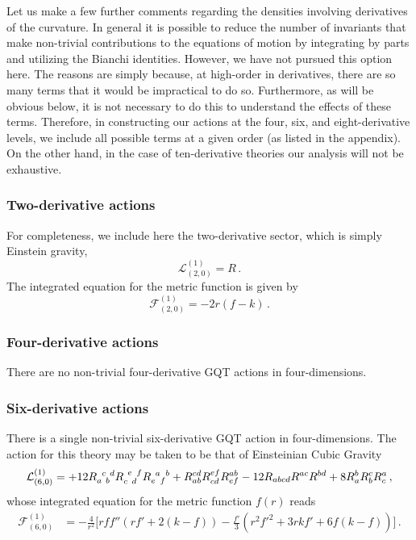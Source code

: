 \documentclass[11pt]{article}
\newcommand{\be}{\begin{equation}}
\newcommand{\ee}{\end{equation} }
\begin{document}
{Let us make a few further comments regarding the densities involving derivatives of the curvature. In general it is possible to reduce the number of invariants that make non-trivial contributions to the equations of motion by integrating by parts and utilizing the Bianchi identities. However, we have not pursued this option here. The reasons are simply because, at high-order in derivatives, there are so many terms that it would be impractical to do so. Furthermore, as will be obvious below, it is not necessary to do this  to understand the effects of these terms. Therefore, in constructing our actions at the four, six, and eight-derivative levels, we include all possible terms at a given order (as listed in the appendix). On the other hand, in the case of ten-derivative theories our analysis will not be exhaustive. %


\subsubsection{Two-derivative actions}

For completeness, we include here the two-derivative sector, which is simply Einstein gravity, 
\begin{equation}
\mathcal{L}_{(2,0)}^{(1)}= R \, .
\end{equation}
The integrated equation for the metric function is given by
\be \label{EEEin}
\mathcal{F}^{(1)}_{(2,0)} = -2 r (f-k) \, .
\ee


\subsubsection{Four-derivative actions}

There are no non-trivial four-derivative GQT actions in four-dimensions.

\subsubsection{Six-derivative actions}

There is a single non-trivial six-derivative GQT action in four-dimensions. The action for this theory may be taken to be that of Einsteinian Cubic Gravity  \cite{PabloPablo}
\begin{equation}
\mathcal{L}_{(6,0)}^{(1)}=+12 \tensor{R}{_{a}^{c}_{b}^{d}}\tensor{R}{_{c}^{e}_{d}^{f}}\tensor{R}{_{e}^{a}_{f}^{b}}+R_{ab}^{cd}R_{cd}^{ef}R_{ef}^{ab}-12R_{abcd}R^{ac}R^{bd}+8R_{a}^{b}R_{b}^{c}R_{c}^{a}\, ,
\end{equation}
whose integrated equation for the metric function $f(r)$ reads \cite{Hennigar:2016gkm,PabloPablo2}
\begin{align}
\mathcal{F}_{(6,0)}^{(1)} &= - \frac{4}{r^2} \bigg[ r f f'' \left(rf' + 2(k-f) \right) - \frac{f'}{3} \left(r^2 f'^2 + 3 r k f' + 6 f(k-f) \right)\bigg] \, .
\end{align}


}
\end{document}
